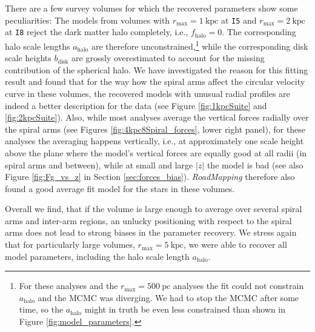 \documentclass[iop,revtex4,numberedappendix,appendixfloats]{emulateapj}
\newcommand{\RM}{{\sl RoadMapping}}
\begin{document}
There are a few survey volumes for which the recovered parameters show some peculiarities: The models from volumes with $r_\text{max}=1~\text{kpc}$ at \texttt{I5} and $r_\text{max}=2~\text{kpc}$ at \texttt{I8} reject the dark matter halo completely, i.e., $f_\text{halo}=0$. The corresponding halo scale lengths $a_\text{halo}$ are therefore unconstrained,\footnote{For these analyses and the $r_\text{max}=500~\text{pc}$ analyses the fit could not constrain $a_\text{halo}$ and the MCMC was diverging. We had to stop the MCMC after some time, so the $a_\text{halo}$ might in truth be even less constrained than shown in Figure \ref{fig:model_parameters}.} while the corresponding disk scale heights $b_\text{disk}$ are grossly overestimated to account for the missing contribution of the spherical halo. We have investigated the reason for this fitting result and found that for the way how the spiral arms affect the circular velocity curve in these volumes, the recovered models with unusual radial profiles are indeed a better description for the data (see Figure \ref{fig:1kpcSuite} and \ref{fig:2kpcSuite}). Also, while most analyses average the vertical forces radially over the spiral arms (see Figures \ref{fig:4kpc8Spiral_forces}, lower right panel), for these analyses the averaging happens vertically, i.e., at approximately one scale height above the plane where the model's vertical forces are equally good at all radii (in spiral arms and between), while at small and large $|z|$ the model is bad (see also Figure \ref{fig:Fg_vs_z} in Section \ref{sec:forces_bias}). \RM{} therefore also found a good average fit model for the stars in these volumes. 

Overall we find, that if the volume is large enough to average over several spiral arms and inter-arm regions, an unlucky positioning with respect to the spiral arms does not lead to strong biases in the parameter recovery. We stress again that for particularly large volumes, $r_\text{max}=5~\text{kpc}$, we were able to recover all model parameters, including the halo scale length $a_\text{halo}$.
\end{document}
